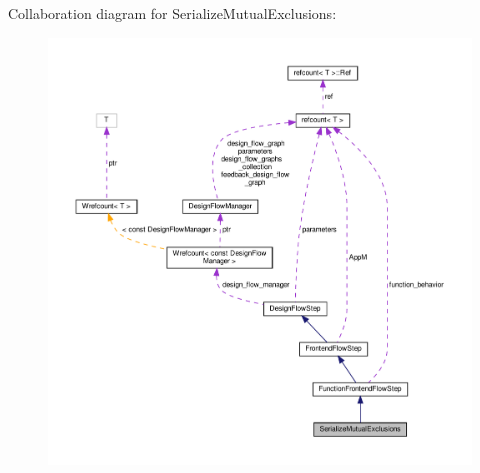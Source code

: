 Collaboration diagram for Serialize\+Mutual\+Exclusions\+:
\nopagebreak
\begin{figure}[H]
\begin{center}
\leavevmode
\includegraphics[width=350pt]{d6/d49/classSerializeMutualExclusions__coll__graph}
\end{center}
\end{figure}
